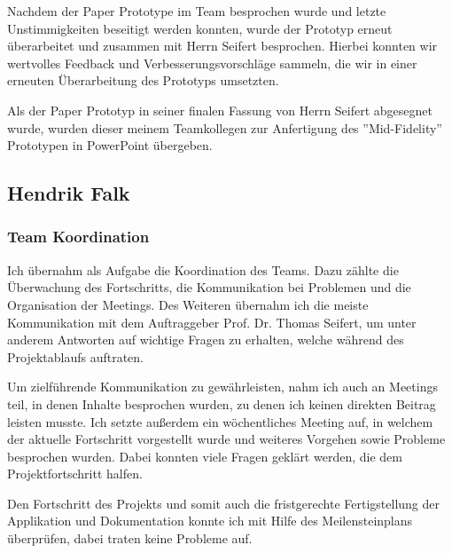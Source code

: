 Nachdem der Paper Prototype im Team besprochen wurde und letzte Unstimmigkeiten beseitigt werden konnten, wurde der Prototyp erneut überarbeitet und zusammen mit Herrn Seifert besprochen. Hierbei konnten wir wertvolles Feedback und Verbesserungsvorschläge sammeln, die wir in einer erneuten Überarbeitung des Prototyps umsetzten. 

Als der Paper Prototyp in seiner finalen Fassung von Herrn Seifert abgesegnet wurde, wurden dieser meinem Teamkollegen zur Anfertigung des ''Mid-Fidelity'' Prototypen in PowerPoint übergeben.

\clearpage

\subsection{Hendrik Falk}

\subsubsection{Team Koordination}

Ich übernahm als Aufgabe die Koordination des Teams. Dazu zählte die Überwachung des Fortschritts, die Kommunikation bei Problemen und die Organisation der Meetings. Des Weiteren übernahm ich die meiste Kommunikation mit dem Auftraggeber Prof. Dr. Thomas Seifert, um unter anderem Antworten auf wichtige Fragen zu erhalten, welche während des Projektablaufs auftraten. 

Um zielführende Kommunikation zu gewährleisten, nahm ich auch an Meetings teil, in denen Inhalte besprochen wurden, zu denen ich keinen direkten Beitrag leisten musste. Ich setzte außerdem ein wöchentliches Meeting auf, in welchem der aktuelle Fortschritt vorgestellt wurde und weiteres Vorgehen sowie Probleme besprochen wurden. Dabei konnten viele Fragen geklärt werden, die dem Projektfortschritt halfen. 

Den Fortschritt des Projekts und somit auch die fristgerechte Fertigstellung der Applikation und Dokumentation konnte ich mit Hilfe des Meilensteinplans überprüfen, dabei traten keine Probleme auf. 

\vspace{1em}


